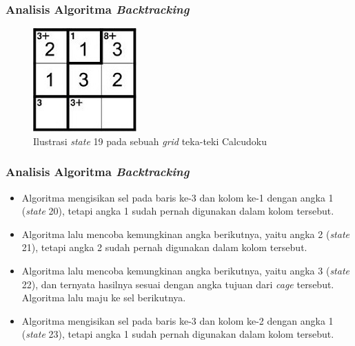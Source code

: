 \documentclass{beamer}
\begin{document}
\begin{frame}
\frametitle{Analisis Algoritma \textit{Backtracking}}
\begin{figure}
\centering
\captionsetup{justification=centering}
\includegraphics[scale=1]{Gambar/Backtracking6}
\caption[Ilustrasi \textit{state} 19 pada sebuah \textit{grid} teka-teki Calcudoku]{Ilustrasi \textit{state} 19 pada sebuah \textit{grid} teka-teki Calcudoku}
\label{fig:backtracking6}
\end{figure}
\end{frame}

\note{

}

\begin{frame}
\frametitle{Analisis Algoritma \textit{Backtracking}}
\begin{itemize}
\item Algoritma mengisikan sel pada baris ke-3 dan kolom ke-1 dengan angka 1 (\textit{state} 20), tetapi angka 1 sudah pernah digunakan dalam kolom tersebut.
\item Algoritma lalu mencoba kemungkinan angka berikutnya, yaitu angka 2 (\textit{state} 21), tetapi angka 2 sudah pernah digunakan dalam kolom tersebut.
\item Algoritma lalu mencoba kemungkinan angka berikutnya, yaitu angka 3 (\textit{state} 22), dan ternyata hasilnya sesuai dengan angka tujuan dari \textit{cage} tersebut. Algoritma lalu maju ke sel berikutnya.
\item Algoritma mengisikan sel pada baris ke-3 dan kolom ke-2 dengan angka 1 (\textit{state} 23), tetapi angka 1 sudah pernah digunakan dalam kolom tersebut.
\end{itemize}
\end{frame}
\end{document}
